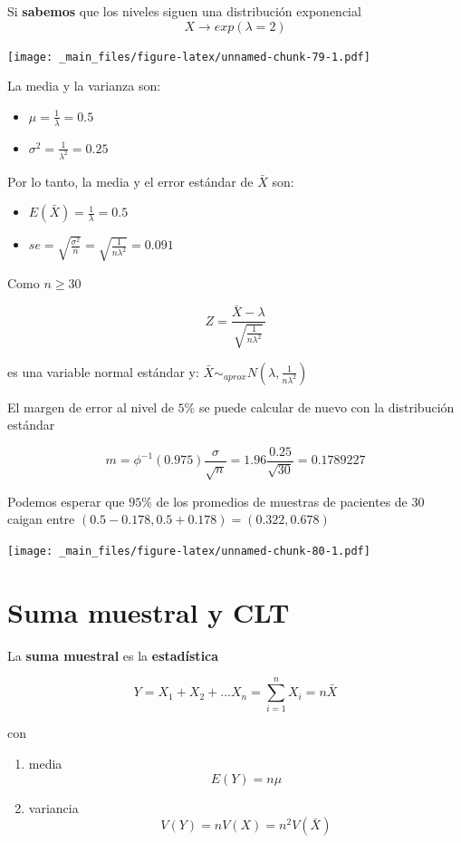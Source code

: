 \documentclass[
]{book}
\providecommand{\tightlist}{%
  \setlength{\itemsep}{0pt}\setlength{\parskip}{0pt}}
\begin{document}
Si \textbf{sabemos} que los niveles siguen una distribución exponencial \[X \rightarrow exp(\lambda=2)\]

\texttt{[image: \_main\_files/figure-latex/unnamed-chunk-79-1.pdf]}

La media y la varianza son:

\begin{itemize}
\tightlist
\item
  \(\mu=\frac{1}{\lambda}=0.5\)
\item
  \(\sigma^2=\frac{1}{\lambda^2}=0.25\)
\end{itemize}

Por lo tanto, la media y el error estándar de \(\bar{X}\) son:

\begin{itemize}
\tightlist
\item
  \(E(\bar{X})=\frac{1}{\lambda}=0.5\)
\item
  \(se=\sqrt{\frac{\sigma^2}{n}}=\sqrt{\frac{1}{n\lambda^2}}=0.091\)
\end{itemize}

Como \(n \geq 30\)

\[Z=\frac{\bar{X}-\lambda}{\sqrt{\frac{1}{n\lambda^2}}}\]

es una variable normal estándar y: \(\bar{X} \sim_{aprox} N(\lambda, \frac{1}{n\lambda^2})\)

El margen de error al nivel de \(5\%\) se puede calcular de nuevo con la distribución estándar

\[m=\phi^{-1}(0.975) \frac{\sigma}{\sqrt{n}}=1.96\frac{0.25}{\sqrt{30}}=0.1789227\]

Podemos esperar que \(95\%\) de los promedios de muestras de pacientes de \(30\) caigan entre
\((0.5-0.178, 0.5+0.178)= (0.322, 0.678)\)

\texttt{[image: \_main\_files/figure-latex/unnamed-chunk-80-1.pdf]}

\hypertarget{suma-muestral-y-clt}{%
\section{Suma muestral y CLT}\label{suma-muestral-y-clt}}

La \textbf{suma muestral} es la \textbf{estadística}

\[Y=X_1+X_2+...X_n=\sum_{i=1}^n X_i=n \bar{X}\]

con

\begin{enumerate}
\def\labelenumi{\arabic{enumi})}
\tightlist
\item
  media \[E(Y)=n\mu\]
\item
  variancia \[V(Y)=nV(X)=n^2V(\bar{X})\]
\end{enumerate}
\end{document}
